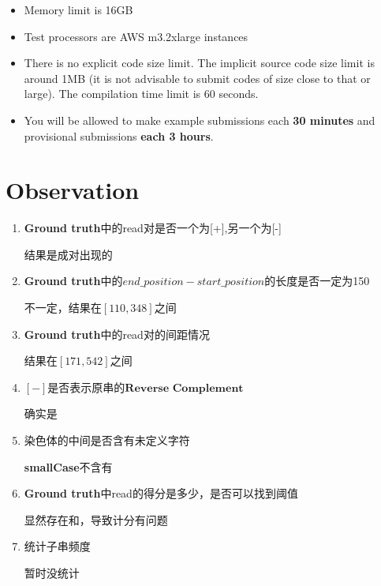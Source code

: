 \documentclass[hyperref,UTF8]{ctexart}
\theoremstyle{definition}
\theoremstyle{remark}
\numberwithin{equation}{subsection}
\newcommand{\Emph}{\textbf}
\begin{document}
	\begin{itemize}
	
		\item Memory limit is 16GB
		
		\item Test processors are AWS m3.2xlarge instances
		
		\item There is no explicit code size limit. The implicit source code size limit is around 1MB
		(it is not advisable to submit codes of size close to that or large). The compilation time limit is 60 seconds.
		
		\item You will be allowed to make example submissions each \Emph{30 minutes} and provisional submissions \Emph{each 3 hours}.
		
	\end{itemize}
	
	
\section{Observation}
\label{sec:observation}
	
	\begin{enumerate}
		
		\item \Emph{Ground truth}中的read对是否一个为[+],另一个为[-]
		
		结果是成对出现的

		\item \Emph{Ground truth}中的$end\_position - start\_position$的长度是否一定为150
		
		不一定，结果在$[110, 348]$之间

		\item \Emph{Ground truth}中的read对的间距情况
		
		结果在$[171, 542]$之间
	
		\item $[-]$是否表示原串的$\Emph{Reverse Complement}$
		
		确实是
				
		\item 染色体的中间是否含有未定义字符
		
		\Emph{smallCase}不含有

		\item \Emph{Ground truth}中read的得分是多少，是否可以找到阈值
		
		显然存在和，导致计分有问题
		
		\item 统计子串频度
		
		暂时没统计
	
	\end{enumerate}
	
\end{document}
